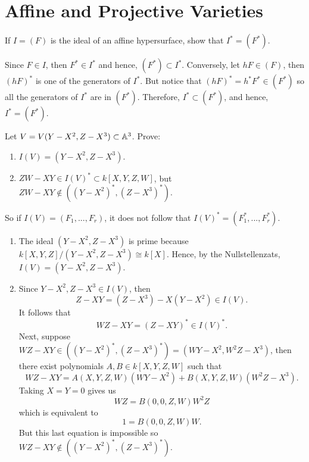 \section{Affine and Projective Varieties}

\begin{exercise}
    If $I = (F)$ is the ideal of an affine hypersurface, show that $I^* = (F^*)$. \\
\end{exercise}

\begin{solution}
    Since $F \in I$, then $F^* \in I^*$ and hence, $(F^*) \subset I^*$. Conversely, let $h F \in (F)$, then $(hF)^*$ is one of the generators of $I^*$. But notice that $(hF)^* = h^*F^* \in (F^*)$ so all the generators of $I^*$ are in $(F^*)$. Therefore, $I^* \subset (F^*)$, and hence, $I^* = (F^*)$. \\
\end{solution}

\begin{exercise}
    Let $V = V(Y-X^2, Z - X^3) \subset \mathbb{A}^3$. Prove:
    \begin{enumerate}
        \item $I(V) = (Y - X^2, Z - X^3)$.
        \item $ZW - XY \in I(V)^*\subset k[X,Y,Z,W]$, but $ZW-XY \notin ((Y-X^2)^*, (Z-X^3)^*)$.
    \end{enumerate}
    So if $I(V) = (F_1, ..., F_r)$, it does not follow that $I(V)^* = (F_1^*, ..., F_r^*)$. \\
\end{exercise}

\begin{solution}
    \begin{enumerate}
        \item The ideal $(Y - X^2, Z - X^3)$ is prime because $k[X,Y,Z]/(Y - X^2, Z - X^3) \cong k[X]$. Hence, by the Nullstellenzats, $I(V) = (Y - X^2, Z - X^3)$.
        \item Since $Y - X^2, Z - X^3 \in I(V)$, then
        $$Z - XY = (Z - X^3) - X(Y - X^2) \in I(V).$$
        It follows that
        $$WZ - XY = (Z-XY)^* \in I(V)^*.$$
        Next, suppose $WZ - XY \in ((Y-X^2)^*, (Z-X^3)^*) = (WY-X^2, W^2Z-X^3)$, then there exist polynomials $A, B \in k[X,Y,Z,W]$ such that
        $$WZ - XY = A(X,Y,Z,W)(WY-X^2) + B(X,Y,Z,W)(W^2Z-X^3).$$
        Taking $X = Y = 0$ gives us 
        $$WZ = B(0,0,Z,W)W^2Z$$
        which is equivalent to
        $$1 = B(0,0,Z,W)W.$$
        But this last equation is impossible so $WZ - XY \notin ((Y-X^2)^*, (Z-X^3)^*)$. \\
    \end{enumerate}
\end{solution}

